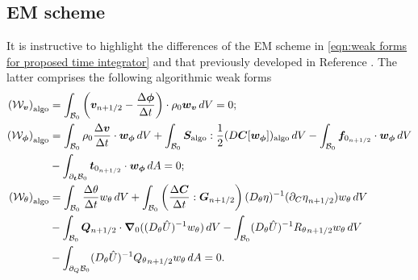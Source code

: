 
\subsection{EM scheme}\label{sec:EM scheme Betsch}
It is instructive to highlight the differences of the EM scheme in \eqref{eqn:weak forms for proposed time integrator} and that previously developed in Reference \cite{Betsch2018Thermo}. The latter comprises the following algorithmic weak forms
%
\begin{equation}\label{eqn:weak forms for proposed time integrator Hesch approach}
\begin{aligned}
\left(\mathcal{W}_{\vect{v}}\right)_{\text{algo}}&=\int_{\mathcal{B}_0}\left(\vect{v}_{n+1/2} - \frac{\Delta\vect{\phi}}{\Delta t}\right)\cdot\rho_0\vect{w}_{\vect{v}}\,dV = 0;\\
%
\left(\mathcal{W}_{\vect{\phi}}\right)_{\text{algo}}&=\int_{\mathcal{B}_0}\rho_0\frac{\Delta\vect{v}}{\Delta t}\cdot\vect{w}_{\vect{\phi}}\,dV + \int_{\mathcal{B}_0}\vect{S}_{\text{algo}}:\frac{1}{2}(D\vect{C}[\vect{w}_{\vect{\phi}}])_{\text{algo}}\,dV-  \int_{\mathcal{B}_0}\vect{f}_{0_{n+1/2}}\cdot\vect{w}_{\vect{\phi}}\,dV\\&-
\int_{\partial_{\boldsymbol{t}}\mathcal{B}_0}\vect{t}_{0_{n+1/2}}\cdot\vect{w}_{\vect{\phi}}\,dA = 0;\\
%
\left(\mathcal{W}_{\theta}\right)_{\text{algo}}&=  \int_{\mathcal{B}_0}\frac{\Delta\theta}{\Delta t}w_{\theta}\,dV + \int_{\mathcal{B}_0}\left(\frac{\Delta \vect{C}}{\Delta t}:\vect{G}_{n+1/2}\right)(D_{\theta}\eta)^{-1}({\partial_{C}\eta}_{n+1/2}) w_{\theta}\,dV\\&  - \int_{\mathcal{B}_0}\vect{Q}_{n+1/2}\cdot\vect{\nabla}_0((D_{\theta}\hat{U})^{-1}w_{\theta})\,dV - \int_{\mathcal{B}_0}(D_{\theta}\hat{U})^{-1}{R_{\theta}}_{n+1/2}w_{\theta}\,dV\\& - \int_{\partial_{Q}\mathcal{B}_{0}}(D_{\theta}\hat{U})^{-1}{Q_{\theta}}_{n+1/2}w_{\theta}\,dA = 0.
%
\end{aligned}
\end{equation}

